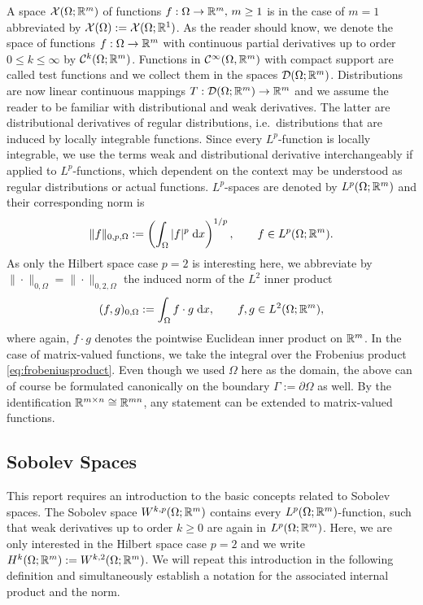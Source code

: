 A space ${\mathcal X}(\Omega;{\mathbb R}^m)$ of functions $f:\Omega\to {\mathbb R}^m,\, m\ge 1$ is in the case of $m=1$ abbreviated by ${\mathcal X}(\Omega):= {\mathcal X}(\Omega;{\mathbb R}^1)$. As the reader should know, we denote the space of functions $f:\Omega\to{\mathbb R}^m$ with continuous partial derivatives up to order $0\le k\le \infty$ by ${\mathcal C}^k(\Omega;{\mathbb R}^m)$. Functions in ${\mathcal C}^\infty(\Omega,{\mathbb R}^m)$ with compact support are called test functions and we collect them in the spaces ${\mathcal D}(\Omega;{\mathbb R}^m)$. Distributions are now linear continuous mappings $T:{\mathcal D}(\Omega;{\mathbb R}^m)\to{\mathbb R}^m$ and we assume the reader to be familiar with distributional and weak derivatives. The latter are distributional derivatives of regular distributions, i.e.\ distributions that are induced by locally integrable functions. Since every $L^p$-function is locally integrable, we use the terms weak and distributional derivative interchangeably if applied to $L^p$-functions, which dependent on the context may be understood as regular distributions or actual functions. $L^p$-spaces are denoted by $L^p(\Omega;{\mathbb R}^m)$ and their corresponding norm is
\begin{equation*}
	\|f\|_{0,p,\Omega}:= \left(\int_\Omega |f|^p\;{{\mathrm{d}} x}\right)^{1/p},\qquad f\in L^p(\Omega;{\mathbb R}^m).
\end{equation*}
As only the Hilbert space case $p=2$ is interesting here, we abbreviate by $\|\cdot\|_{0,\Omega} = \|\cdot\|_{0,2,\Omega}$ the induced norm of the $L^2$ inner product
\begin{equation*}
	(f,g)_{0,\Omega}:= \int_\Omega f\cdot g\;{{\mathrm{d}} x},\qquad f,g\in L^2(\Omega;{\mathbb R}^m),
\end{equation*}
where again, $f\cdot g$ denotes the pointwise Euclidean inner product on ${\mathbb R}^m$. In the case of matrix-valued functions, we take the integral over the Frobenius product \eqref{eq:frobeniusproduct}. Even though we used $\Omega$ here as the domain, the above can of course be formulated canonically on the boundary $\Gamma:=\partial\Omega$ as well. By the identification ${\mathbb R}^{m\times n}\cong {\mathbb R}^{mn}$, any statement can be extended to matrix-valued functions.

\subsection{Sobolev Spaces}

This report requires an introduction to the basic concepts related to Sobolev spaces. The Sobolev space $W^{k,p}(\Omega;{\mathbb R}^m)$ contains every $L^p(\Omega;{\mathbb R}^m)$-function, such that weak derivatives up to order $k\ge 0$ are again in $L^p(\Omega;{\mathbb R}^m)$. Here, we are only interested in the Hilbert space case $p= 2$ and we write $H^k(\Omega;{\mathbb R}^m):= W^{k,2}(\Omega;{\mathbb R}^m)$. We will repeat this introduction in the following definition and simultaneously establish a notation for the associated internal product and the norm.

